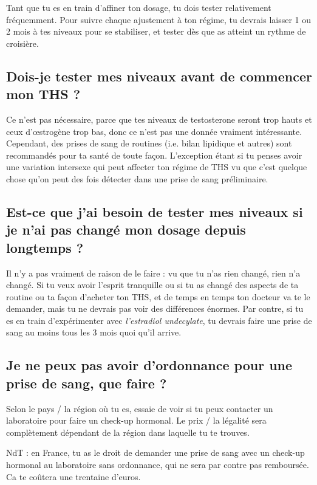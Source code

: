 \documentclass{article}
\begin{document}
Tant que tu es en train d'affiner ton dosage, tu dois tester relativement fréquemment. Pour suivre chaque ajustement à ton régime, tu devrais laisser 1 ou 2 mois à tes niveaux pour se stabiliser, et tester dès que as atteint un rythme de croisière.

\subsection{Dois-je tester mes niveaux avant de commencer mon THS ?}

Ce n'est pas nécessaire, parce que tes niveaux de testosterone seront trop hauts et ceux d'œstrogène trop bas, donc ce n'est pas une donnée vraiment intéressante. Cependant, des prises de sang de routines (i.e. bilan lipidique et autres) sont recommandés pour ta santé de toute façon. L'exception étant si tu penses avoir une variation intersexe qui peut affecter ton régime de THS vu que c'est quelque chose qu'on peut des fois détecter dans une prise de sang préliminaire.

\subsection{Est-ce que j'ai besoin de tester mes niveaux si je n'ai pas changé mon dosage depuis longtemps ?}

Il n'y a pas vraiment de raison de le faire : vu que tu n'as rien changé, rien n'a changé. Si tu veux avoir l'esprit tranquille ou si tu as changé des aspects de ta routine ou ta façon d'acheter ton THS, et de temps en temps ton docteur va te le demander, mais tu ne devrais pas voir des différences énormes. Par contre, si tu es en train d'expérimenter avec \textit{l'estradiol undecylate}, tu devrais faire une prise de sang au moins tous les 3 mois quoi qu'il arrive. 

\subsection{Je ne peux pas avoir d'ordonnance pour une prise de sang, que faire ?}


Selon le pays / la région où tu es, essaie de voir si tu peux contacter un laboratoire pour faire un check-up hormonal. Le prix / la légalité sera complètement dépendant de la région dans laquelle tu te trouves. 

NdT : en France, tu as le droit de demander une prise de sang avec un check-up hormonal au laboratoire sans ordonnance, qui ne sera par contre pas remboursée. Ca te coûtera une trentaine d'euros.
\end{document}
